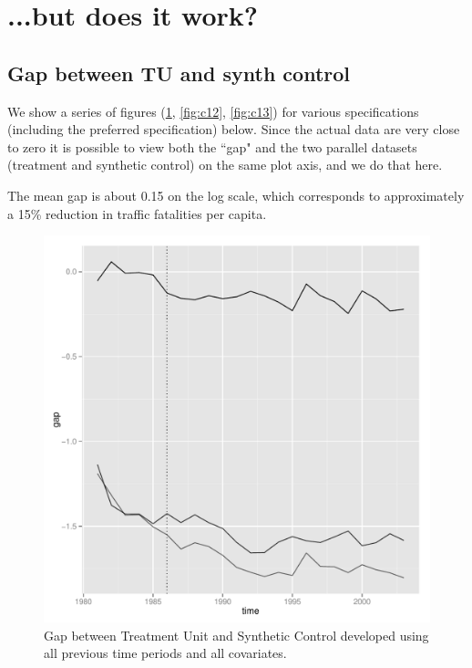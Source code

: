 \documentclass[letterpaper, 12pt]{article}
\begin{document}

\section{...but does it work?}


\subsection{Gap between TU and synth control}

We show a series of figures (\ref{fig:c11}, \ref{fig:c12}, \ref{fig:c13}) for various specifications (including the preferred specification) below.  Since the actual data are very close to zero it is possible to view both the ``gap" and the two parallel datasets (treatment and synthetic control) on the same plot axis, and we do that here.  

The mean gap is about 0.15 on the log scale, which corresponds to approximately a 15\% reduction in traffic fatalities per capita.    

\begin{figure}[htbp]
\begin{center}
\includegraphics{img-gap-full.pdf}
\caption{Gap between Treatment Unit and Synthetic Control developed using all previous time periods and all covariates.}
\label{fig:c11}
\end{center}
\end{figure}
\end{document}
